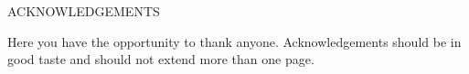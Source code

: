\begin{center}
    ACKNOWLEDGEMENTS
    \vspace{5mm} %
\end{center} 

Here you have the opportunity to thank anyone. Acknowledgements should be in good taste and should not extend more than one page.